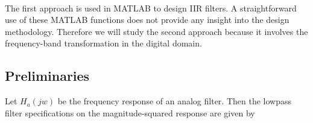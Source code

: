 \documentclass{article}
\begin{document}
 \\
\vspace{1em}
The first approach is used in MATLAB to design IIR filters. A
straightforward use of these MATLAB functions does not provide any
insight into the design methodology. Therefore we will study the second
approach because it involves the frequency-band transformation in the
digital domain. 

\newpage
\subsection{Preliminaries}
Let $H_a(jw)$ be the frequency response of an analog filter. Then the lowpass
filter specifications on the magnitude-squared response are given by 
\end{document}
